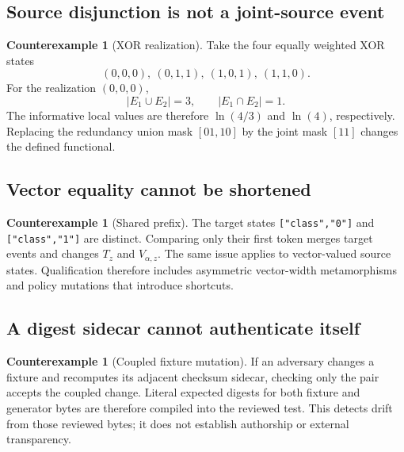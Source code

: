 \documentclass[11pt]{article}
\theoremstyle{definition}
\newtheorem{counterexample}[theorem]{Counterexample}
\begin{document}
\subsection{Source disjunction is not a joint-source event}

\begin{counterexample}[XOR realization]\label{cex:union}
Take the four equally weighted XOR states
\begin{equation}
  (0,0,0),\ (0,1,1),\ (1,0,1),\ (1,1,0).
\end{equation}
For the realization $(0,0,0)$,
\begin{equation}
  |E_1\cup E_2|=3,
  \qquad
  |E_1\cap E_2|=1.
\end{equation}
The informative local values are therefore $\ln(4/3)$ and $\ln(4)$, respectively.  Replacing the
redundancy union mask $[01,10]$ by the joint mask $[11]$ changes the defined functional.
\end{counterexample}

\subsection{Vector equality cannot be shortened}

\begin{counterexample}[Shared prefix]
The target states \texttt{["class","0"]} and \texttt{["class","1"]} are distinct.  Comparing only
their first token merges target events and changes $T_z$ and $V_{\alpha,z}$.  The same issue applies
to vector-valued source states.  Qualification therefore includes asymmetric vector-width
metamorphisms and policy mutations that introduce shortcuts.
\end{counterexample}

\subsection{A digest sidecar cannot authenticate itself}

\begin{counterexample}[Coupled fixture mutation]
If an adversary changes a fixture and recomputes its adjacent checksum sidecar, checking only the
pair accepts the coupled change.  Literal expected digests for both fixture and generator bytes
are therefore compiled into the reviewed test.  This detects drift from those reviewed bytes; it
does not establish authorship or external transparency.
\end{counterexample}
\end{document}
